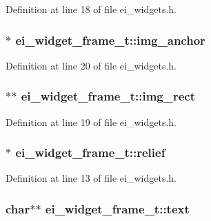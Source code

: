 Definition at line 18 of file ei\-\_\-widgets.\-h.

\hypertarget{structei__widget__frame__t_a72c13290dd6e955f3dbc94d753c40bdd}{
\subsubsection[{img\-\_\-anchor}]{$\ast$ ei\-\_\-widget\-\_\-frame\-\_\-t\-::img\-\_\-anchor}}\label{structei__widget__frame__t_a72c13290dd6e955f3dbc94d753c40bdd}


Definition at line 20 of file ei\-\_\-widgets.\-h.

\hypertarget{structei__widget__frame__t_aacfdf74bb9814b393106ff891c951487}{
\subsubsection[{img\-\_\-rect}]{$\ast$$\ast$ ei\-\_\-widget\-\_\-frame\-\_\-t\-::img\-\_\-rect}}\label{structei__widget__frame__t_aacfdf74bb9814b393106ff891c951487}


Definition at line 19 of file ei\-\_\-widgets.\-h.

\hypertarget{structei__widget__frame__t_a8e597038a1f61dae86b5f27bef78bfee}{
\subsubsection[{relief}]{$\ast$ ei\-\_\-widget\-\_\-frame\-\_\-t\-::relief}}\label{structei__widget__frame__t_a8e597038a1f61dae86b5f27bef78bfee}


Definition at line 13 of file ei\-\_\-widgets.\-h.

\hypertarget{structei__widget__frame__t_ac7a94855acf51ebccf61827ed81ed4d0}{
\subsubsection[{text}]{\setlength{\rightskip}{0pt plus 5cm}char$\ast$$\ast$ ei\-\_\-widget\-\_\-frame\-\_\-t\-::text}}\label{structei__widget__frame__t_ac7a94855acf51ebccf61827ed81ed4d0}


